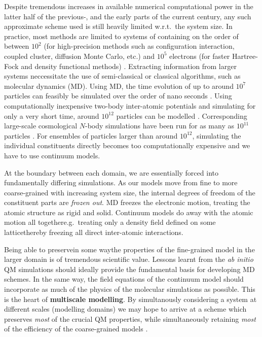 \documentclass[twoside,english]{uiofysmaster}
\begin{document}
Despite tremendous increases in available numerical computational power in the latter half of the previous-, and the early parts of the current century, any such approximate scheme used is still heavily limited w.r.t.\ the system size. In practice, most methods are limited to systems of containing on the order of between $10^2$ (for high-precision methods such as configuration interaction, coupled cluster, diffusion Monte Carlo, etc.) and $10^5$ electrons (for faster Hartree-Fock and density functional methods) \cite{hu,bowler,vandevondele}. Extracting information from larger systems neccessitate the use of semi-classical or classical algorithms, such as molecular dynamics (MD). Using MD, the time evolution of up to around $10^7$ particles can feasibly be simulated over the order of nano seconds \cite{Zhao2013,Reddy}. Using computationally inexpensive two-body inter-atomic potentials and simulating for only a very short time, around $10^{12}$ particles can be modelled \cite{trillion}. Corresponding large-scale cosmological $N$-body simulations have been run for as many as $10^{11}$ particles \cite{angulo,kim}. For ensembles of particles larger than around $10^{12}$, simulating the individual constituents directly becomes too computationally expensive and we have to use continuum models.

At the boundary between each domain, we are essentially forced into fundamentally differing simulations. As our models move from fine to more coarse-grained with increasing system size, the internal degrees of freedom of the constituent parts are \emph{frozen out}. MD freezes the electronic motion, treating the atomic structure as rigid and solid. Continuum models do away with the atomic motion all together\textemdash e.g.\ treating only a density field defined on some lattice\textemdash thereby freezing all direct inter-atomic interactions.

Being able to preserve\textemdash in some way\textemdash the properties of the fine-grained model in the larger domain is of tremendous scientific value. Lessons learnt from the \emph{ab initio} QM simulations should ideally provide the fundamental basis for developing MD schemes. In the same way, the field equations of the continuum model should incorporate as much of the physics of the molecular simulations as possible. This is the heart of {\bf multiscale modelling}. By simultanously considering a system at different scales (modelling domains) we may hope to arrive at a scheme which preserves \emph{most} of the crucial QM properties, while simultaneously retaining \emph{most} of the efficiency of the coarse-grained models \cite{weinan}.
\end{document}
